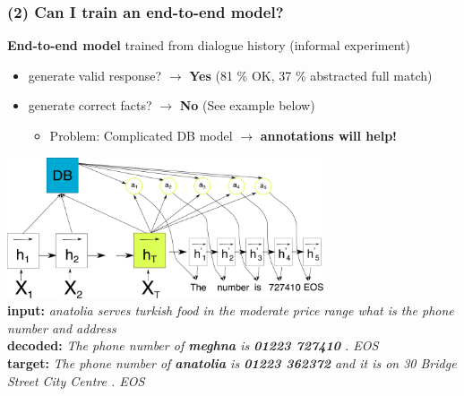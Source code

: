 \documentclass[10pt, compress,british,xcolor={svgnames,dvipsnames,x11names},trans]{beamer}
\begin{document}
\begin{frame}\frametitle{(2) Can I train an end-to-end model? }
    {\bf End-to-end model} trained from dialogue history (informal experiment)
    \begin{itemize}
        \item generate valid response? $\longrightarrow$ {\bf Yes} {\footnotesize (81 \% OK, 37 \% abstracted full match)}
        \item generate correct facts? $\longrightarrow$ {\bf No} {\footnotesize (See example below)} 
            \begin{itemize}
                \item Problem: Complicated DB model $\longrightarrow$ {\bf annotations will help!}
            \end{itemize}
    \end{itemize}
    \includegraphics[width=0.7\textwidth]{./encdecdb.pdf} \\
    \vfill
    {\footnotesize
    {\bf input:} {\it anatolia serves turkish food in the moderate price range what is the phone number and address} \\
    {\bf decoded:} {\it The phone number of {\bf meghna} is {\bf 01223 727410} . EOS} \\
    {\bf target:} {\it The phone number of {\bf anatolia} is {\bf 01223 362372} and it is on 30 Bridge Street City Centre . EOS } \\
    }
\end{frame}
\end{document}
